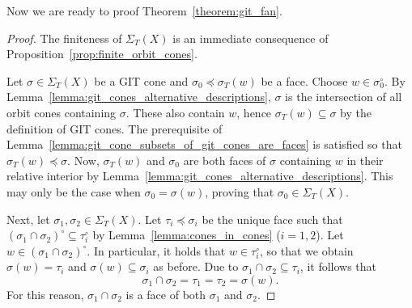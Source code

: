 Now we are ready to proof Theorem~\ref{theorem:git_fan}.
\begin{proof}
	The finiteness of $\Sigma_T(X)$ is an immediate consequence of Proposition~\ref{prop:finite_orbit_cones}. 
	
	Let $\sigma\in\Sigma_T(X)$ be a GIT cone and $\sigma_0\preceq\sigma_T(w)$ be a face. Choose $w\in\sigma_0^\circ$. By Lemma~\ref{lemma:git_cones_alternative_descriptions}, $\sigma$ is the intersection of all orbit cones containing $\sigma$. These also contain $w$, hence $\sigma_T(w)\subseteq \sigma$ by the definition of GIT cones. The prerequisite of Lemma~\ref{lemma:git_cone_subsets_of_git_cones_are_faces} is satisfied so that $\sigma_T(w)\preceq \sigma$. Now, $\sigma_T(w)$ and $\sigma_0$ are both faces of $\sigma$ containing $w$ in their relative interior by Lemma~\ref{lemma:git_cones_alternative_descriptions}. This may only be the case when $\sigma_0 = \sigma(w)$, proving that $\sigma_0\in\Sigma_T(X)$.
	
	Next, let $\sigma_1,\sigma_2\in\Sigma_T(X)$. Let $\tau_i\preceq\sigma_i$ be the unique face such that $(\sigma_1\cap\sigma_2)^\circ \subseteq \tau_i^\circ$ by Lemma~\ref{lemma:cones_in_cones} ($i=1,2$). Let $w\in(\sigma_1\cap\sigma_2)^\circ$. In particular, it holds that $w\in\tau_i^\circ$, so that we obtain $\sigma(w) = \tau_i$ and $\sigma(w)\subseteq \sigma_i$ as before. Due to $\sigma_1 \cap \sigma_2 \subseteq \tau_i$, it follows that 
	$$\sigma_1 \cap \sigma_2 = \tau_1 = \tau_2 = \sigma(w).$$
	For this reason, $\sigma_1 \cap \sigma_2$ is a face of both $\sigma_1$ and $\sigma_2$.
\end{proof}